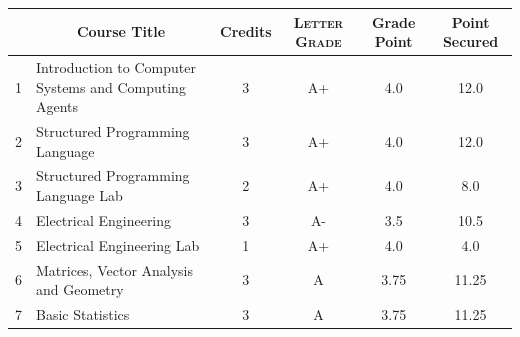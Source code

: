 \documentclass[11pt]{article}
\newcommand*{\numtwo}[1]{\pgfmathprintnumber[
                    fixed, precision=2, fixed zerofill=true]{#1}}
\begin{document}
                \begin{center}
                    \renewcommand{\arraystretch}{1.08}
                    
                \begin{tabular}{|c|l|c|>{\scshape}c|c|c|}
                \hline  \rule[-1ex]{0pt}{3.5ex} {\centering{\bf Course Code}} &  \multicolumn{1}{c|}{\textbf{Course Title}}  & {\bf Credits} & {\bf Letter Grade} & {\bf Grade Point} & {\bf Point Secured}  \\ 
                \hline   1 &  Introduction to Computer Systems and Computing Agents		 & 3 & A+ & 4.0 & 12.0 \\ %
                \hline   2 &  Structured Programming Language		 & 3 & A+ & 4.0 & 12.0 \\ %
                \hline   3 &  Structured Programming Language Lab		 & 2 & A+ & 4.0 & 8.0 \\ %
                \hline   4 &  Electrical Engineering		 & 3 & A- & 3.5 & 10.5 \\ %
                \hline   5 &  Electrical Engineering Lab		 & 1 & A+ & 4.0 & 4.0 \\ %
                \hline   6 &  Matrices, Vector Analysis and Geometry		 & 3 & A & 3.75 & 11.25 \\ %
                \hline   7 &  Basic Statistics		 & 3 & A & 3.75 & 11.25 \\ %

\hline                %
                \end{tabular}
                \end{center}
                \renewcommand{\arraystretch}{1.03}
\end{document}
